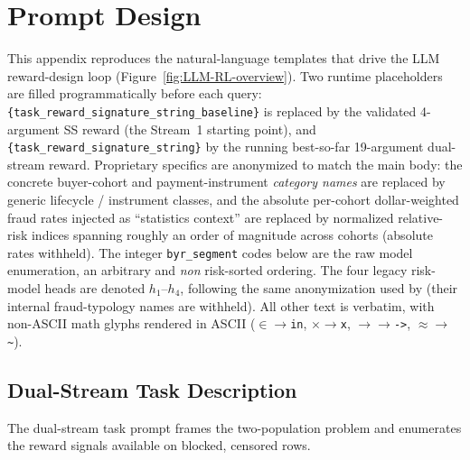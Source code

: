 \documentclass[11pt]{article}
\begin{document}
\section{Prompt Design}
\label{appendix:prompts}
This appendix reproduces the natural-language templates that drive the LLM
reward-design loop (Figure~\ref{fig:LLM-RL-overview}). Two runtime placeholders
are filled programmatically before each query:
{\small\texttt{\{task\_reward\_signature\_string\_baseline\}}} is replaced by the
validated 4-argument SS reward (the Stream~1 starting point), and
\texttt{\{task\_reward\_signature\_string\}} by the running best-so-far
19-argument dual-stream reward. Proprietary specifics are anonymized to match the main
body: the concrete buyer-cohort and payment-instrument \emph{category names} are
replaced by generic lifecycle / instrument classes, and the absolute per-cohort
dollar-weighted fraud rates injected as ``statistics context'' are replaced by
normalized relative-risk indices spanning roughly an order of magnitude across
cohorts (absolute rates withheld). The integer \texttt{byr\_segment} codes below
are the raw model enumeration, an arbitrary and \emph{non} risk-sorted ordering. The
four legacy risk-model heads are denoted $h_1$--$h_4$, following the same
anonymization used by \citet{qu2025llmenhanced} (their internal fraud-typology
names are withheld).
All other text is verbatim, with non-ASCII math glyphs rendered in ASCII
($\in\rightarrow$\texttt{in}, $\times\rightarrow$\texttt{x},
$\rightarrow\rightarrow$\texttt{->}, $\approx\rightarrow$\texttt{\textasciitilde}).

\subsection{Dual-Stream Task Description}
\label{appendix:prompt-task}
The dual-stream task prompt frames the two-population problem and enumerates
the reward signals available on blocked, censored rows.
\end{document}
